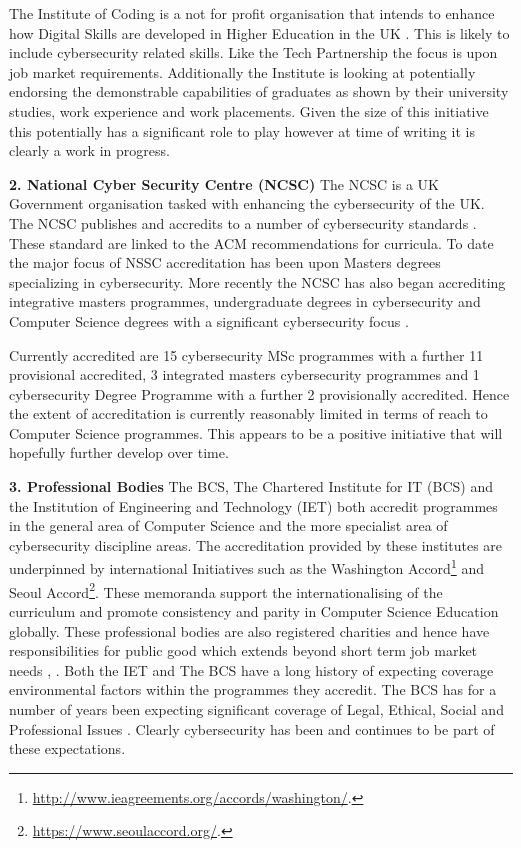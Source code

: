 \documentclass[conference]{IEEEtran}
\begin{document}
The Institute of Coding is a not for profit organisation that intends to enhance how Digital Skills are developed in Higher Education in the UK \cite{Davenportetal2019a}. This is likely to include cybersecurity related skills. Like the Tech Partnership the focus is upon job market requirements. Additionally the Institute is looking at potentially endorsing the demonstrable capabilities of graduates as shown by their university studies, work experience and work placements. Given the size of this initiative this potentially has a significant role to play however at time of writing it is clearly a work in progress.

\textbf{2. National Cyber Security Centre (NCSC)}
The NCSC is a UK Government organisation tasked with enhancing the cybersecurity of the UK. The NCSC publishes and accredits to a number of cybersecurity standards \cite{NCSC2018a}. These standard are linked to the ACM recommendations for curricula. To date the major focus of NSSC accreditation has been upon Masters degrees specializing in cybersecurity. More recently the NCSC has also began accrediting integrative masters programmes, undergraduate degrees in cybersecurity and Computer Science degrees with a significant cybersecurity focus \cite{NCSC2018b}.

Currently accredited are 15 cybersecurity MSc programmes with a further 11 provisional accredited, 3 integrated masters cybersecurity programmes and 1 cybersecurity Degree Programme with a further 2 provisionally accredited. Hence the extent of accreditation is currently reasonably limited in terms of reach to Computer Science programmes. This appears to be a positive initiative that will hopefully further develop over time. 

\textbf{3. Professional Bodies}
The BCS, The Chartered Institute for IT (BCS) and the Institution of Engineering and Technology (IET) both accredit programmes in the general area of Computer Science and the more specialist area of cybersecurity discipline areas. The accreditation provided by these institutes are underpinned by international Initiatives such as the Washington Accord\footnote{\url{http://www.ieagreements.org/accords/washington/}.} and Seoul Accord\footnote{\url{https://www.seoulaccord.org/}.}. These memoranda support the internationalising of the curriculum and promote consistency and parity in Computer Science Education globally.   These professional bodies are also registered charities and hence have responsibilities for public good which extends beyond short term job market needs \cite{Stensaker2006}, \cite{Mutereko2017}. Both the IET and The BCS have a long history of expecting coverage environmental factors within the programmes they accredit. The BCS has for a number of years been expecting significant coverage of Legal, Ethical, Social and Professional Issues \cite{Brooke2018}. Clearly cybersecurity has been and continues to be part of these expectations. 
\end{document}
